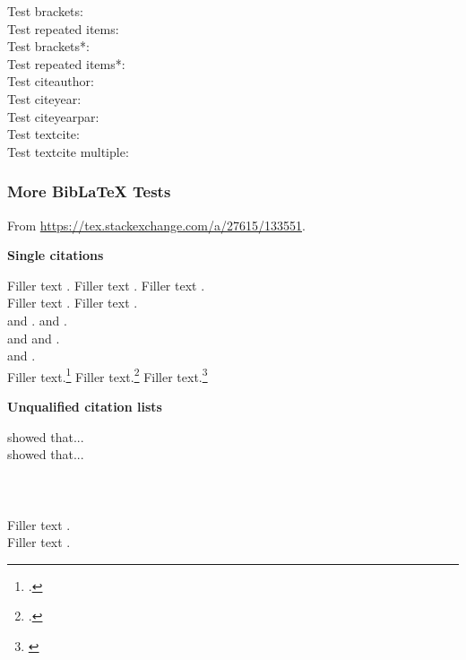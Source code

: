 \documentclass[acmsmall,review,anonymous,natbib=false]{acmart}\settopmatter{printfolios=true,printccs=false}
\begin{document}
Test brackets:~\cite{gf-tag-sound-repo,ad-wood-2003}\\
Test repeated items:~\cite{897367,Buss:1987:VTB:897367}\\
Test brackets*:~\cite*{gf-tag-sound-repo,ad-wood-2003}\\
Test repeated items*:~\cite*{897367,Buss:1987:VTB:897367}\\
Test citeauthor: ~\citeauthor{ad-wood-2003}\\
Test citeyear: ~\citeyear{ad-wood-2003}\\
Test citeyearpar: ~\citeyearpar{ad-wood-2003}\\
Test textcite: ~\textcite{ad-wood-2003}\\
Test textcite multiple: ~\textcite{ad-wood-2003,897367,Buss:1987:VTB:897367}\\

\subsubsection{More BibLaTeX Tests}

From \url{https://tex.stackexchange.com/a/27615/133551}.

\textbf{Single citations}

Filler text \parencite{Knuth98}.
Filler text \parencite{Lamport:LaTeX}. Filler text \parencite{Amsthm15}. \\
Filler text \parencite[See][23]{Knuth98}.
Filler text \parencite[1--10]{Lamport:LaTeX}. \\
\textcite{knuth:texbook} and \textcite{Knuth97}.
\textcite{Knuth98} and \textcite{knuth:texbook}. \\
\textcite{Knuth98} and \textcite{Lamport:LaTeX} and \textcite{Amsthm15}. \\
\textcite[e.g.][]{Knuth98} and \textcite[10]{Lamport:LaTeX}. \\
Filler text.\footcite[23]{Knuth98} Filler text.\footcite[1--10]{Knuth97}
Filler text.\footnote{\smartcite[10--15]{Goossens:1999:LWC:553897}}

\textbf{Unqualified citation lists}

\textcite{knuth:texbook,Knuth97,Knuth98,knuth:texbook} showed that... \\
\textcite[e.g.][10--15]{Knuth98,Knuth97,Amsthm15} showed that...\\
\textcite[e.g.][]{Knuth97,Knuth98} \\
\textcite[10--15]{Knuth97,Knuth98} \\
\parencite[See][for example]{Knuth97,Knuth98} \\
Filler text \parencite[See][for example]{Knuth98,Knuth97,Amsthm15}. \\
Filler text \parencite[etc.]{knuth:texbook,Knuth97,Knuth98,knuth:texbook}.
\end{document}
